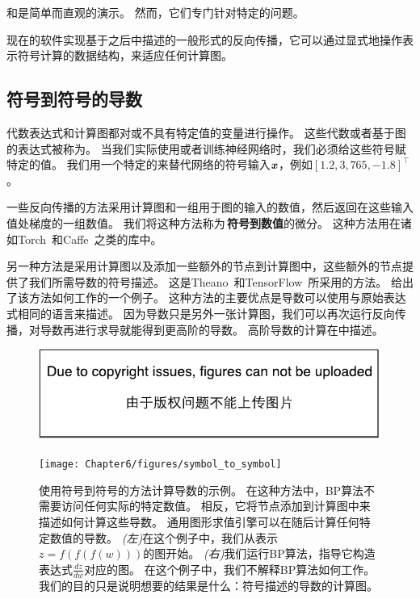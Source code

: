 和是简单而直观的演示。
然而，它们专门针对特定的问题。

现在的软件实现基于之后中描述的一般形式的反向传播，它可以通过显式地操作表示符号计算的数据结构，来适应任何计算图。



\subsection{符号到符号的导数}
\label{sec:symbol_to_symbol_derivatives}

代数表达式和计算图都对或不具有特定值的变量进行操作。
这些代数或者基于图的表达式被称为。
当我们实际使用或者训练神经网络时，我们必须给这些符号赋特定的值。
我们用一个特定的来替代网络的符号输入$\boldsymbol{\mathit{x}}$，例如$[1.2, 3,765, -1.8]^\top$。

一些反向传播的方法采用计算图和一组用于图的输入的数值，然后返回在这些输入值处梯度的一组数值。
我们将这种方法称为\,\textbf{符号到数值}的微分。
这种方法用在诸如Torch~\citep{Torch-2011}和Caffe~\citep{Jia13caffe}之类的库中。

 
另一种方法是采用计算图以及添加一些额外的节点到计算图中，这些额外的节点提供了我们所需导数的符号描述。
这是Theano~\citep{bergstra+al:2010-scipy-small,Bastien-Theano-2012}和TensorFlow~\citep{tensorflow}所采用的方法。
给出了该方法如何工作的一个例子。
这种方法的主要优点是导数可以使用与原始表达式相同的语言来描述。
因为导数只是另外一张计算图，我们可以再次运行反向传播，对导数再进行求导就能得到更高阶的导数。
高阶导数的计算在中描述。
\begin{figure}[!htb]
\ifOpenSource
\centerline{\includegraphics{figure.pdf}}
\else
\centerline{\texttt{[image: Chapter6/figures/symbol\_to\_symbol]}}
\fi
\captionsetup{singlelinecheck=off}
\caption{使用符号到符号的方法计算导数的示例。
在这种方法中，\gls{BP}算法不需要访问任何实际的特定数值。
相反，它将节点添加到计算图中来描述如何计算这些导数。
通用图形求值引擎可以在随后计算任何特定数值的导数。
\emph{(左)}在这个例子中，我们从表示$z=f(f(f(w)))$的图开始。
\emph{(右)}我们运行\gls{BP}算法，指导它构造表达式$\frac{dz}{dw}$对应的图。 在这个例子中，我们不解释\gls{BP}算法如何工作。
我们的目的只是说明想要的结果是什么：符号描述的导数的计算图。}
\label{fig:chap6_symbol_to_symbol}
\end{figure}

